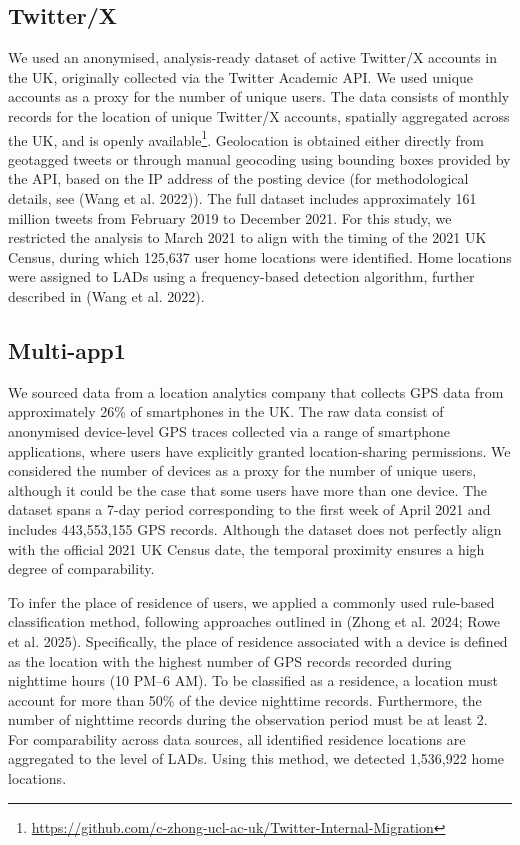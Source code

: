 \documentclass{article}
\begin{document}
\subsection{Twitter/X}\label{twitterx}

We used an anonymised, analysis-ready dataset of active Twitter/X
accounts in the UK, originally collected via the Twitter Academic API.
We used unique accounts as a proxy for the number of unique users. The
data consists of monthly records for the location of unique Twitter/X
accounts, spatially aggregated across the UK, and is openly available\footnote{\url{https://github.com/c-zhong-ucl-ac-uk/Twitter-Internal-Migration}}.
Geolocation is obtained either directly from geotagged tweets or through
manual geocoding using bounding boxes provided by the API, based on the
IP address of the posting device (for methodological details, see
(Wang et al. 2022)). The full dataset includes approximately 161 million tweets
from February 2019 to December 2021. For this study, we restricted the
analysis to March 2021 to align with the timing of the 2021 UK Census,
during which 125,637 user home locations were identified. Home locations
were assigned to LADs using a frequency-based detection algorithm,
further described in (Wang et al. 2022).

\subsection{Multi-app1}\label{multi-app1}

We sourced data from a location analytics company that collects GPS data
from approximately 26\% of smartphones in the UK. The raw data consist of
anonymised device-level GPS traces collected via a range of smartphone
applications, where users have explicitly granted location-sharing
permissions. We considered the number of devices as a proxy for the
number of unique users, although it could be the case that some users
have more than one device. The dataset spans a 7-day period
corresponding to the first week of April 2021 and includes 443,553,155
GPS records. Although the dataset does not perfectly align with the
official 2021 UK Census date, the temporal proximity ensures a high
degree of comparability.

To infer the place of residence of users, we applied a commonly used
rule-based classification method, following approaches outlined in
(Zhong et al. 2024; Rowe et al. 2025). Specifically, the place of
residence associated with a device is defined as the location with the
highest number of GPS records recorded during nighttime hours (10 PM--6
AM). To be classified as a residence, a location must account for more
than 50\% of the device nighttime records. Furthermore, the number of
nighttime records during the observation period must be at least 2. For
comparability across data sources, all identified residence locations
are aggregated to the level of LADs. Using this method, we detected
1,536,922 home locations.
\end{document}

